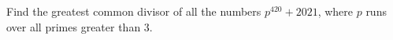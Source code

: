 Find the greatest common divisor of all the numbers $p^{420}+2021$, where $p$ runs over all primes greater than $3$.
